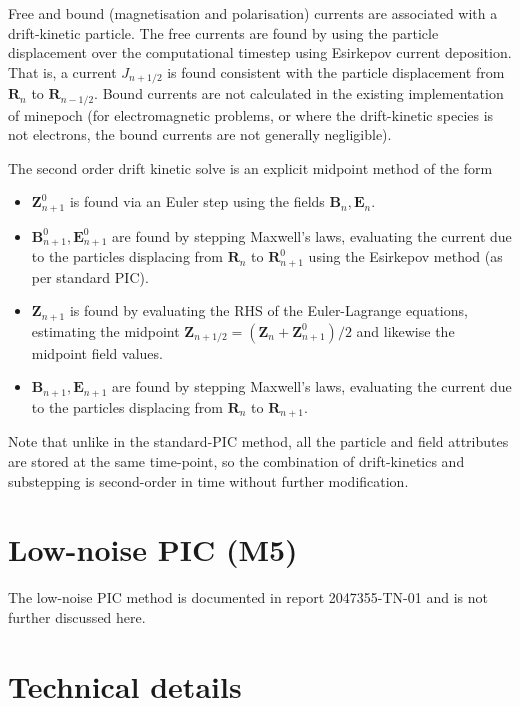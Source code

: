 \documentclass{article}
\begin{document}
Free and bound (magnetisation and polarisation) currents are associated with a drift-kinetic particle. The free currents are found by using the particle displacement over the computational timestep using Esirkepov current deposition. That is, a current $J_{n+1/2}$ is found consistent with the particle displacement from $\mathbf{R}_n$ to $\mathbf{R}_{n-1/2}$. Bound currents are not calculated in the existing implementation of minepoch (for electromagnetic problems, or where the drift-kinetic species is not electrons, the bound currents are not generally negligible).

The second order drift kinetic solve is an explicit midpoint method of the form
\begin{itemize}
\item
  $\mathbf{Z}_{n+1}^0$ is found via an Euler step using the fields $\mathbf{B}_n,\mathbf{E}_n$.
\item
  $\mathbf{B}^0_{n+1},\mathbf{E}^0_{n+1}$ are found by stepping Maxwell's laws, evaluating the current due to the particles displacing from $\mathbf{R}_n$ to $\mathbf{R}_{n+1}^0$ using the Esirkepov method (as per standard PIC).
\item
  $\mathbf{Z}_{n+1}$ is found by evaluating the RHS of the Euler-Lagrange equations, estimating the midpoint $\mathbf{Z}_{n+1/2} = (\mathbf{Z}_n + \mathbf{Z}_{n+1}^0)/2$ and likewise the midpoint field values.
\item
  $\mathbf{B}_{n+1},\mathbf{E}_{n+1}$ are found by stepping Maxwell's laws, evaluating the current due to the particles displacing from $\mathbf{R}_n$ to $\mathbf{R}_{n+1}$.
\end{itemize}

Note that unlike in the standard-PIC method, all the particle and field attributes are stored at the same time-point, so the combination of drift-kinetics and substepping is second-order in time without further modification.

\section{Low-noise PIC (M5) }

The low-noise PIC method is documented in report 2047355-TN-01 and is not further discussed here.

\section{Technical details}
\end{document}
